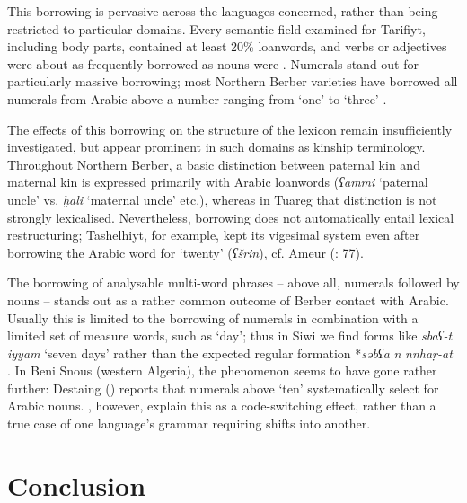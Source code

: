 \documentclass[output=paper]{langsci/langscibook}
\begin{document}
This borrowing is pervasive across the languages concerned, rather than being restricted to particular domains. Every semantic field examined for Tarifiyt, including body parts, contained at least 20\% loanwords, and verbs or adjectives were about as frequently borrowed as nouns were \citep{Kossmann2009}. Numerals stand out for particularly massive borrowing; most Northern Berber varieties have borrowed all numerals from Arabic above a number ranging from `one' to `three' \citep{Souag2007}.

The effects of this borrowing on the structure of the lexicon remain insufficiently investigated, but appear prominent in such domains as kinship terminology. Throughout Northern Berber, a basic distinction between paternal kin and maternal kin is expressed primarily with Arabic loanwords (\textit{ʕammi} `paternal uncle' vs. \textit{ḫali} `maternal uncle' etc.), whereas in Tuareg that distinction is not strongly lexicalised. Nevertheless, borrowing does not automatically entail lexical restructuring; Tashelhiyt, for example, kept its vigesimal system even after borrowing the Arabic word for `twenty' (\textit{ʕšrin}), cf. Ameur (\citeyear{Ameur2008}: 77).

The borrowing of analysable multi-word phrases – above all, numerals followed by nouns – stands out as a rather common outcome of Berber contact with Arabic. Usually this is limited to the borrowing of numerals in combination with a limited set of measure words, such as `day'; thus in Siwi we find forms like \textit{sbaʕ-t} \textit{iyyam} `seven days' rather than the expected regular formation *\textit{səbʕa} \textit{n} \textit{nnhaṛ-at }\citep[114]{Souag2013book}. In Beni Snous (western Algeria), the phenomenon seems to have gone rather further: Destaing (\citeyear[212]{Destaing1907}) reports that numerals above `ten' systematically select for Arabic nouns.  \citet{SouagKherbache2016}, however, explain this as a code-switching effect, rather than a true case of one language's grammar requiring shifts into another.

\section{Conclusion}
\end{document}
